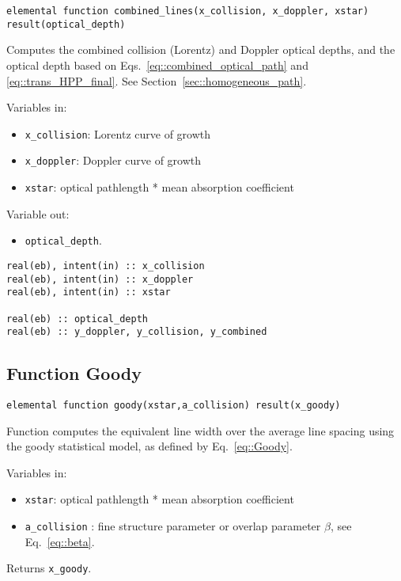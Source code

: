 \begin{lstlisting}
elemental function combined_lines(x_collision, x_doppler, xstar) result(optical_depth)
\end{lstlisting}

Computes the combined collision (Lorentz) and Doppler optical depths, and the optical depth based on Eqs.~\ref{eq::combined_optical_path} and \ref{eq::trans_HPP_final}. See Section~\ref{sec::homogeneous_path}.

Variables in:
\begin{itemize}
 \item \verb=x_collision=: Lorentz curve of growth
 \item \verb=x_doppler=: Doppler curve of growth
 \item \verb=xstar=: optical pathlength * mean absorption coefficient
\end{itemize}

Variable out:
\begin{itemize}
 \item \verb=optical_depth=.
\end{itemize}

\begin{lstlisting}
real(eb), intent(in) :: x_collision
real(eb), intent(in) :: x_doppler
real(eb), intent(in) :: xstar

real(eb) :: optical_depth
real(eb) :: y_doppler, y_collision, y_combined
\end{lstlisting}

\subsection{Function Goody}

\begin{lstlisting}
elemental function goody(xstar,a_collision) result(x_goody)
\end{lstlisting}
 Function computes the equivalent line width over the average line spacing using the goody statistical model, as defined by Eq.~\ref{eq::Goody}.

 Variables in:
 \begin{itemize}
  \item \verb=xstar=: optical pathlength * mean absorption coefficient
  \item \verb=a_collision= : fine structure parameter or overlap parameter $\beta$, see Eq.~\ref{eq::beta}.
  \end{itemize}

Returns \verb=x_goody=.

